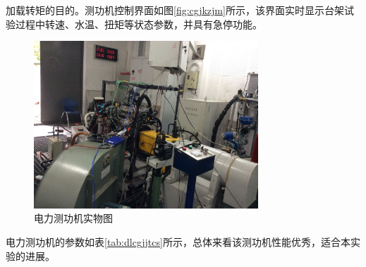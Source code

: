 加载转矩的目的。测功机控制界面如图\ref{fig:cgjkzjm}所示，该界面实时显示台架试验过程中转速、水温、扭矩等状态参数，并具有急停功能。\par
\begin{figure}[htb]
	\centering
	\includegraphics[width=0.75\textwidth]{thesis_figure/platformer_chapter/dlcgjswt}
	\caption{电力测功机实物图}
	\label{fig:dlcgjswt}
\end{figure}
电力测功机的参数如表\ref{tab:dlcgjjtcs}所示，总体来看该测功机性能优秀，适合本实验的进展。
